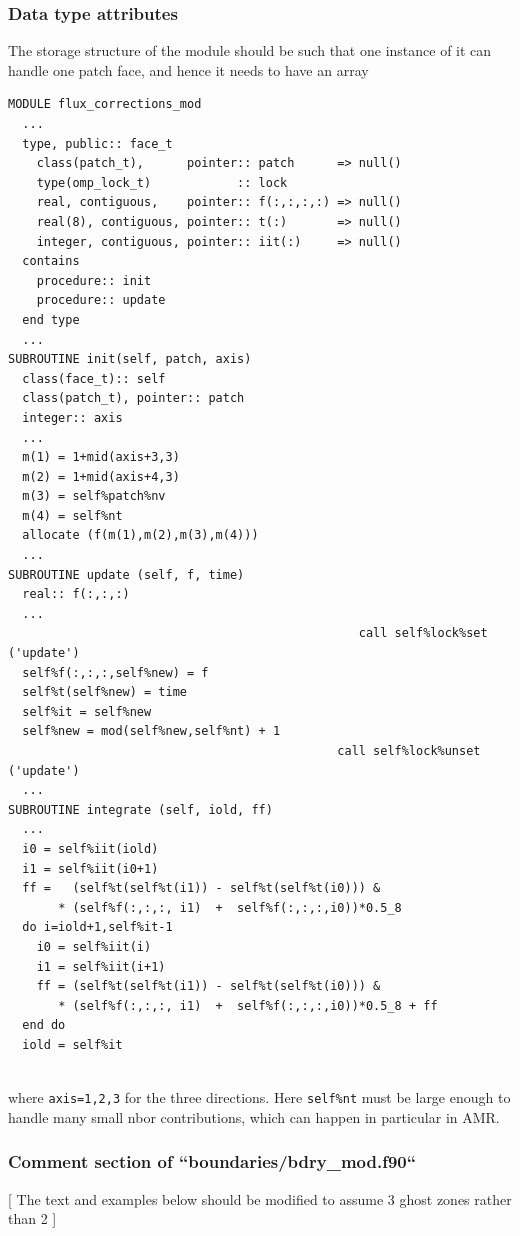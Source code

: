 \documentclass[paper=a4,fontsize=11pt]{scrartcl}
\numberwithin{equation}{section}		%
\numberwithin{figure}{section}			%
\numberwithin{table}{section}				%
\newcommand{\codecolor}{\color{Blue}}
\newcommand{\Code}[1]{{\codecolor\texttt{#1}}}
\begin{document}
\subsubsection{Data type attributes}
The storage structure of the module should be such that one instance of it can handle one patch face, and hence it needs to have an array
{\codecolor\begin{verbatim}
MODULE flux_corrections_mod
  ...
  type, public:: face_t
    class(patch_t),      pointer:: patch      => null()
    type(omp_lock_t)            :: lock
    real, contiguous,    pointer:: f(:,:,:,:) => null()
    real(8), contiguous, pointer:: t(:)       => null()
    integer, contiguous, pointer:: iit(:)     => null()
  contains
    procedure:: init
    procedure:: update
  end type
  ...
SUBROUTINE init(self, patch, axis)
  class(face_t):: self
  class(patch_t), pointer:: patch
  integer:: axis
  ...
  m(1) = 1+mid(axis+3,3)
  m(2) = 1+mid(axis+4,3)
  m(3) = self%patch%nv
  m(4) = self%nt
  allocate (f(m(1),m(2),m(3),m(4)))
  ...
SUBROUTINE update (self, f, time)
  real:: f(:,:,:)
  ...
                                                 call self%lock%set ('update')
  self%f(:,:,:,self%new) = f
  self%t(self%new) = time
  self%it = self%new
  self%new = mod(self%new,self%nt) + 1
                                              call self%lock%unset ('update')
  ...
SUBROUTINE integrate (self, iold, ff)
  ...
  i0 = self%iit(iold)
  i1 = self%iit(i0+1)
  ff =   (self%t(self%t(i1)) - self%t(self%t(i0))) &
       * (self%f(:,:,:, i1)  +  self%f(:,:,:,i0))*0.5_8
  do i=iold+1,self%it-1
    i0 = self%iit(i)
    i1 = self%iit(i+1)
    ff = (self%t(self%t(i1)) - self%t(self%t(i0))) &
       * (self%f(:,:,:, i1)  +  self%f(:,:,:,i0))*0.5_8 + ff
  end do
  iold = self%it
  
\end{verbatim}}
where \Code{axis=1,2,3} for the three directions.  Here \Code{self\%nt} must be large enough to handle many small nbor contributions, which can happen in particular in AMR.


\subsubsection{Comment section of ``boundaries/bdry\_mod.f90``}
[ The text and examples below should be modified to assume 3 ghost zones rather than 2 ]
\end{document}
